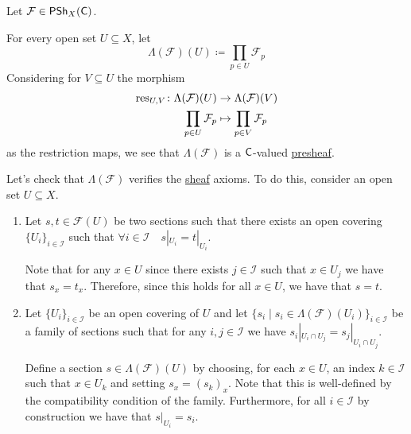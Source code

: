 \documentclass[../../main]{subfiles}
\begin{document}
\begin{construction} \label{const:sheafification-godement}
  Let \(\mathcal{F} \in \mathsf{PSh}_{X}(\mathsf{\mathsf{C}})\).

  For every open set \(U \subseteq X\), let
  \begin{equation*}
    \Lambda(\mathcal{F})(U) \coloneq \prod_{p \in U} \mathcal{F}_{p}
  \end{equation*}
  Considering for \(V \subseteq U\) the morphism
  \begin{align*}
    \operatorname{res}_{U, V}\colon \Lambda(\mathcal{F})(U) &\to \Lambda(\mathcal{F})(V) \\
    \prod_{p \in U} \mathcal{F}_{p} &\mapsto \prod_{p \in V} \mathcal{F}_{p}
  \end{align*}
  as the restriction maps, we see that \(\Lambda(\mathcal{F})\) is a \(\mathsf{\mathsf{C}}\)-valued \hyperref[def:presheaf]{presheaf}.

  Let's check that \(\Lambda(\mathcal{F})\) verifies the \hyperref[def:sheaf]{sheaf} axioms.
  To do this, consider an open set \(U \subseteq X\).
  \begin{enumerate}[label=SH.\arabic*), ref=SH.\arabic*]
    \item Let \(s, t \in \mathcal{F}(U)\) be two sections such that there exists an open covering \(\{U_{i}\}_{i \in \mathcal{I}}\) such that \(\forall i \in \mathcal{I} \quad s|_{U_{i}} = t|_{U_{i}}\).

          Note that for any \(x \in U\) since there exists \(j \in \mathcal{I}\) such that \(x \in U_{j}\) we have that \(s_{x} = t_{x}\).
          Therefore, since this holds for all \(x \in U\), we have that \(s = t\).
    \item Let \(\{U_{i}\}_{i \in \mathcal{I}}\) be an open covering of \(U\) and let \(\{s_{i} \mid s_{i} \in \Lambda(\mathcal{F})(U_{i})\}_{i \in \mathcal{I}}\) be a family of sections such that for any \(i, j \in \mathcal{I}\) we have \(s_{i}|_{U_{i} \cap U_{j}} = s_{j}|_{U_{i} \cap U_{j}}\).

          Define a section \(s \in \Lambda(\mathcal{F})(U)\) by choosing, for each \(x \in U\), an index \(k \in \mathcal{I}\) such that \(x \in U_{k}\) and setting \(s_{x} = (s_{k})_{x}\).
          Note that this is well-defined by the compatibility condition of the family.
          Furthermore, for all \(i \in \mathcal{I}\) by construction we have that \(s|_{U_{i}} = s_{i}\).
  \end{enumerate}


\end{construction}
\end{document}
